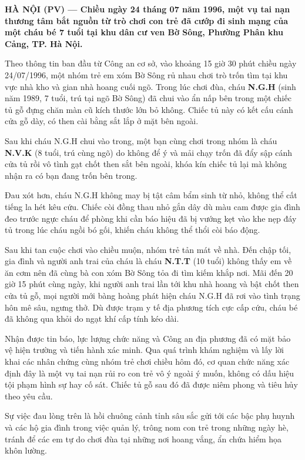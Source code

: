 \documentclass[12pt,a4paper]{article}
\begin{document}
\textbf{HÀ NỘI (PV) — Chiều ngày 24 tháng 07 năm 1996, một vụ tai nạn thương tâm bắt nguồn từ trò chơi con trẻ đã cướp đi sinh mạng của một cháu bé 7 tuổi tại khu dân cư ven Bờ Sông, Phường Phân khu Cảng, TP. Hà Nội.}


Theo thông tin ban đầu từ Công an cơ sở, vào khoảng 15 giờ 30 phút chiều ngày 24/07/1996, một nhóm trẻ em xóm Bờ Sông rủ nhau chơi trò trốn tìm tại khu vực nhà kho và gian nhà hoang cuối ngõ. Trong lúc chơi đùa, cháu \textbf{N.G.H} (sinh năm 1989, 7 tuổi, trú tại ngõ Bờ Sông) đã chui vào ẩn nấp bên trong một chiếc tủ gỗ đựng chăn màn cũ kích thước lớn bỏ không. Chiếc tủ này có kết cấu cánh cửa gỗ dày, có then cài bằng sắt lắp ở mặt bên ngoài.


Sau khi cháu N.G.H chui vào trong, một bạn cùng chơi trong nhóm là cháu \textbf{N.V.K} (8 tuổi, trú cùng ngõ) do không để ý và mải chạy trốn đã đẩy sập cánh cửa tủ rồi vô tình gạt chốt then sắt bên ngoài, khóa kín chiếc tủ lại mà không nhận ra có bạn đang trốn bên trong.


Đau xót hơn, cháu N.G.H không may bị tật câm bẩm sinh từ nhỏ, không thể cất tiếng la hét kêu cứu. Chiếc còi đồng thau nhỏ gắn dây dù màu cam được gia đình đeo trước ngực cháu để phòng khi cần báo hiệu đã bị vướng kẹt vào khe nẹp đáy tủ trong lúc cháu ngồi bó gối, khiến cháu không thể thổi còi báo động.


Sau khi tan cuộc chơi vào chiều muộn, nhóm trẻ tản mát về nhà. Đến chập tối, gia đình và người anh trai của cháu là cháu \textbf{N.T.T} (10 tuổi) không thấy em về ăn cơm nên đã cùng bà con xóm Bờ Sông tỏa đi tìm kiếm khắp nơi. Mãi đến 20 giờ 15 phút cùng ngày, khi người anh trai lần tới khu nhà hoang và bật chốt then cửa tủ gỗ, mọi người mới bàng hoàng phát hiện cháu N.G.H đã rơi vào tình trạng hôn mê sâu, ngưng thở. Dù được trạm y tế địa phương tích cực cấp cứu, cháu bé đã không qua khỏi do ngạt khí cấp tính kéo dài.


Nhận được tin báo, lực lượng chức năng và Công an địa phương đã có mặt bảo vệ hiện trường và tiến hành xác minh. Qua quá trình khám nghiệm và lấy lời khai các nhân chứng cùng nhóm trẻ chơi chiều hôm đó, cơ quan chức năng xác định đây là một vụ tai nạn rủi ro con trẻ vô ý ngoài ý muốn, không có dấu hiệu tội phạm hình sự hay cố sát. Chiếc tủ gỗ sau đó đã được niêm phong và tiêu hủy theo yêu cầu.


Sự việc đau lòng trên là hồi chuông cảnh tỉnh sâu sắc gửi tới các bậc phụ huynh và các hộ gia đình trong việc quản lý, trông nom con trẻ trong những ngày hè, tránh để các em tự do chơi đùa tại những nơi hoang vắng, ẩn chứa hiểm họa khôn lường.
\end{document}
